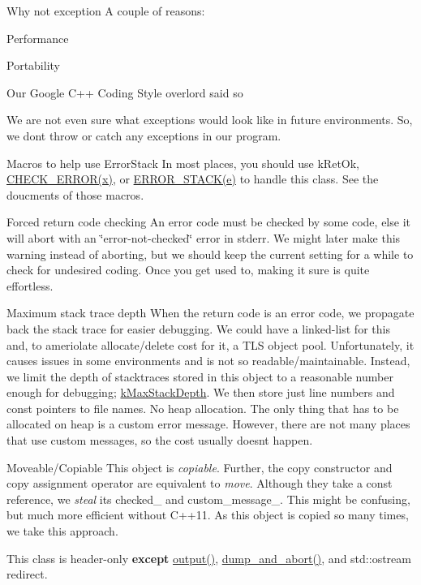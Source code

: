 \begin{DoxyParagraph}{Why not exception}
A couple of reasons\+: \begin{DoxyItemize}
\item Performance \item Portability \item Our Google C++ Coding Style overlord said so\end{DoxyItemize}
We are not even sure what exceptions would look like in future environments. So, we don\textquotesingle{}t throw or catch any exceptions in our program.
\end{DoxyParagraph}
\begin{DoxyParagraph}{Macros to help use Error\+Stack}
In most places, you should use k\+Ret\+Ok, \hyperlink{group__ERRORCODES_ga72a80915c3588aea09c053ab567e19c4}{C\+H\+E\+C\+K\+\_\+\+E\+R\+R\+O\+R(x)}, or \hyperlink{group__ERRORCODES_gaf2fc6952d71aa10a52c326a27a0746da}{E\+R\+R\+O\+R\+\_\+\+S\+T\+A\+C\+K(e)} to handle this class. See the doucments of those macros.
\end{DoxyParagraph}
\begin{DoxyParagraph}{Forced return code checking}
An error code must be checked by some code, else it will abort with an \char`\"{}error-\/not-\/checked\char`\"{} error in stderr. We might later make this warning instead of aborting, but we should keep the current setting for a while to check for undesired coding. Once you get used to, making it sure is quite effortless.
\end{DoxyParagraph}
\begin{DoxyParagraph}{Maximum stack trace depth}
When the return code is an error code, we propagate back the stack trace for easier debugging. We could have a linked-\/list for this and, to ameriolate allocate/delete cost for it, a T\+LS object pool. Unfortunately, it causes issues in some environments and is not so readable/maintainable. Instead, we limit the depth of stacktraces stored in this object to a reasonable number enough for debugging; \hyperlink{classalps_1_1ErrorStack_a18b861743a2de89ca205ffa2d91e6997abd01de12344bb39aa89faef49805ac46}{k\+Max\+Stack\+Depth}. We then store just line numbers and const pointers to file names. No heap allocation. The only thing that has to be allocated on heap is a custom error message. However, there are not many places that use custom messages, so the cost usually doesn\textquotesingle{}t happen.
\end{DoxyParagraph}
\begin{DoxyParagraph}{Moveable/\+Copiable}
This object is {\itshape copiable}. Further, the copy constructor and copy assignment operator are equivalent to {\itshape move}. Although they take a const reference, we {\itshape steal} its checked\+\_\+ and custom\+\_\+message\+\_\+. This might be confusing, but much more efficient without C++11. As this object is copied so many times, we take this approach.
\end{DoxyParagraph}
This class is header-\/only {\bfseries except} \hyperlink{classalps_1_1ErrorStack_afe67ad7f9830b1ef263f867109230b54}{output()}, \hyperlink{classalps_1_1ErrorStack_a30461e6b34692f7ee11db1995d52d0ac}{dump\+\_\+and\+\_\+abort()}, and std\+::ostream redirect. 

